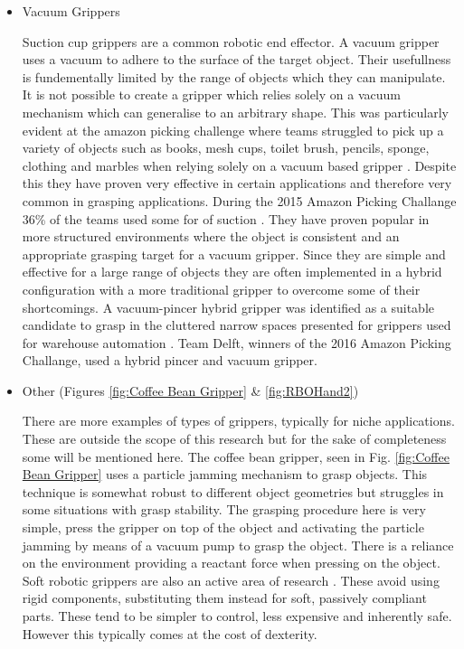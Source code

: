 \begin{itemize}
    \item Vacuum Grippers
    
    Suction cup grippers are a common robotic end effector. A vacuum gripper uses a vacuum to adhere to the surface of the target object. Their usefullness is fundementally limited by the range of objects which they can manipulate. It is not possible to create a gripper which relies solely on a vacuum mechanism which can generalise to an arbitrary shape. This was particularly evident at the amazon picking challenge where teams struggled to pick up a variety of objects such as books, mesh cups, toilet brush, pencils, sponge, clothing and marbles when relying solely on a vacuum based gripper \cite{APCGripper, APCObservations}. Despite this they have proven very effective in certain applications and therefore very common in grasping applications. During the 2015 Amazon Picking Challange 36\% of the teams used some for of suction \cite{APCObservations}. They have proven popular in more structured environments where the object is consistent and an appropriate grasping target for a vacuum gripper. Since they are simple and effective for a large range of objects they are often implemented in a hybrid configuration with a more traditional gripper \cite{Nakamoto2019} to overcome some of their shortcomings. A vacuum-pincer hybrid gripper was identified as a suitable candidate to grasp in the cluttered narrow spaces presented for grippers used for warehouse automation \cite{Hasegawa2017}. Team Delft, winners of the 2016 Amazon Picking Challange, used a hybrid pincer and vacuum gripper\cite{Delft}.
    
    \item Other (Figures \ref{fig:Coffee Bean Gripper} \& \ref{fig:RBOHand2})
    
    There are more examples of types of grippers, typically for niche applications. These are outside the scope of this research but for the sake of completeness some will be mentioned here. The coffee bean gripper, seen in Fig. \ref{fig:Coffee Bean Gripper} uses a particle jamming mechanism to grasp objects. This technique is somewhat robust to different object geometries but struggles in some situations with grasp stability. The grasping procedure here is very simple, press the gripper on top of the object and activating the particle jamming by means of a vacuum pump to grasp the object. There is a reliance on the environment providing a reactant force when pressing on the object. Soft robotic grippers are also an active area of research \cite{RBOHand2}. These avoid using rigid components, substituting them instead for soft, passively compliant parts. These tend to be simpler to control, less expensive and inherently safe. However this typically comes at the cost of dexterity.
    
\end{itemize}

